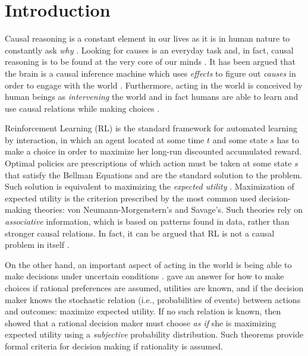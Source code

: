 \documentclass[review]{elsarticle}
\begin{document}
\section{Introduction}
\label{intro}
Causal reasoning is a constant element in our lives as it is in human nature to constantly ask \textit{why} \citep{spirtes2000causation,pearl2018why}. Looking for causes is an everyday task and, in fact, causal reasoning is to be found at the very core of our minds \citep{tversky1977causal,waldmann2013causal,danks2014unifying,neil2019causality}. It has been argued that the brain is a causal inference machine which uses \textit{effects} to figure out \textit{causes} in order to engage with the world \citep{friston2010free,clark2015surfing}. 
Furthermore, acting in the world is conceived by human beings as \textit{intervening} the world and in fact humans are able to learn and use causal relations while making choices \citep{ tversky1980causal,lagnado2007beyond,hagmayer2008causal,hagmayer2009decision,hagmayer2017causality}.

Reinforcement Learning (RL) \citep{sutton1998reinforcement} is the standard framework for automated learning by interaction, in which an agent located at some time $t$ and some state $s$ has to make a choice in order to maximize her long-run discounted accumulated reward. Optimal policies are prescriptions of which action must be taken at some state $s$ that satisfy the Bellman Equations \citep{Puterman:1994:MDP:528623} and are the standard solution to the problem. Such solution is equivalent to maximizing the \textit{expected utility} \citep{shoham2008multiagent,webb2007game}. Maximization of expected utility is the criterion prescribed by the most common used decision-making theories: von Neumann-Morgenstern's and Savage's. Such theories rely on \textit{associative} information, which is based on patterns found in data, rather than stronger causal relations. In fact, it can be argued that RL is not a causal problem in itself \cite{gonzalezsoto2019reinforcement}.

On the other hand, an important aspect of acting in the world is being able to make decisions under uncertain conditions \citep{bernardo2000bayesian,kahneman2000choices,gilboa2009decision,lake2017building}. \cite{von1944theory} gave an answer for how to make choices if rational preferences are assumed, utilities are known, and if the decision maker knows the stochastic relation (i.e., probabilities of events) between actions and outcomes: maximize expected utility. If no such relation is known, then \cite{savage1954the} showed that a rational decision maker must choose \textit{as if} she is maximizing expected utility using a \textit{subjective} probability distribution. Such theorems provide formal criteria for decision making if rationality is assumed. 
\end{document}
